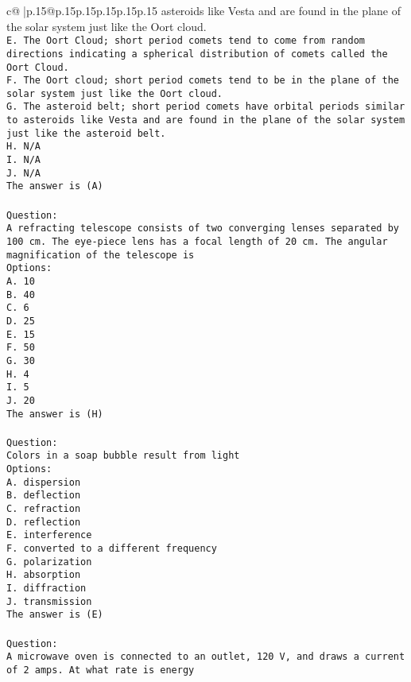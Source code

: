 \documentclass{article}
\begin{document}
{\begin{supertabular}{c@{$\;$}|p{.15\linewidth}@{}p{.15\linewidth}p{.15\linewidth}p{.15\linewidth}p{.15\linewidth}p{.15\linewidth}}
{{{asteroids like Vesta and are found in the plane of the solar system just like the Oort cloud.\\ \tt E. The Oort Cloud; short period comets tend to come from random directions indicating a spherical distribution of comets called the Oort Cloud.\\ \tt F. The Oort cloud; short period comets tend to be in the plane of the solar system just like the Oort cloud.\\ \tt G. The asteroid belt; short period comets have orbital periods similar to asteroids like Vesta and are found in the plane of the solar system just like the asteroid belt.\\ \tt H. N/A\\ \tt I. N/A\\ \tt J. N/A\\ \tt The answer is (A)\\ \tt \\ \tt Question:\\ \tt A refracting telescope consists of two converging lenses separated by 100 cm. The eye-piece lens has a focal length of 20 cm. The angular magnification of the telescope is\\ \tt Options:\\ \tt A. 10\\ \tt B. 40\\ \tt C. 6\\ \tt D. 25\\ \tt E. 15\\ \tt F. 50\\ \tt G. 30\\ \tt H. 4\\ \tt I. 5\\ \tt J. 20\\ \tt The answer is (H)\\ \tt \\ \tt Question:\\ \tt Colors in a soap bubble result from light\\ \tt Options:\\ \tt A. dispersion\\ \tt B. deflection\\ \tt C. refraction\\ \tt D. reflection\\ \tt E. interference\\ \tt F. converted to a different frequency\\ \tt G. polarization\\ \tt H. absorption\\ \tt I. diffraction\\ \tt J. transmission\\ \tt The answer is (E)\\ \tt \\ \tt Question:\\ \tt A microwave oven is connected to an outlet, 120 V, and draws a current of 2 amps. At what rate is energy }}}
\end{supertabular}}
\end{document}
